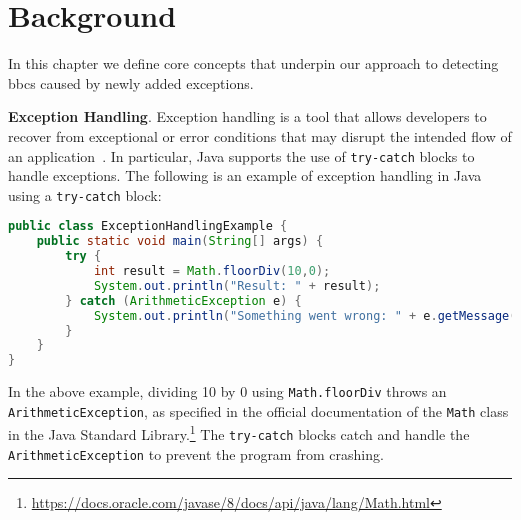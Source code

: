 \chapter{Background}\label{background}

In this chapter we define core concepts that underpin our approach to detecting
\gls{bbc}s caused by newly added exceptions.

\textbf{Exception Handling}. Exception handling is a tool that allows developers to recover from
exceptional or error conditions that may disrupt the intended flow of an application~\cite{Suman2016exception}.
In particular, Java supports the use of \texttt{try-catch} blocks to handle exceptions.
The following is an example of exception handling in Java using a \texttt{try-catch}
block:

\begin{lstlisting}[language=java]
public class ExceptionHandlingExample {
    public static void main(String[] args) {
        try {
            int result = Math.floorDiv(10,0);
            System.out.println("Result: " + result);
        } catch (ArithmeticException e) {
            System.out.println("Something went wrong: " + e.getMessage());
        }
    }
}
\end{lstlisting}

In the above example, dividing 10 by 0 using \texttt{Math.floorDiv} throws an
\texttt{ArithmeticException}, as specified in the official documentation of the
\texttt{Math} class in the Java Standard Library.\footnote{\url{https://docs.oracle.com/javase/8/docs/api/java/lang/Math.html}}
The \texttt{try-catch} blocks catch and handle the \texttt{ArithmeticException}
to prevent the program from crashing.



